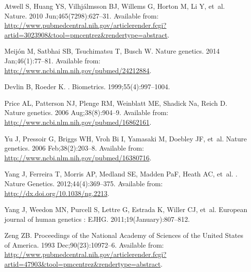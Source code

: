 \documentclass[10pt,letterpaper]{article}
\begin{document}
\begin{thebibliography}{10}
Atwell S, Huang YS, Vilhj\'{a}lmsson BJ, Willems G, Horton M, Li Y, et~al.
\newblock Nature. 2010 Jun;465(7298):627--31.
\newblock Available from:
  \url{http://www.pubmedcentral.nih.gov/articlerender.fcgi?artid=3023908\&tool=pmcentrez\&rendertype=abstract}.

Meij\'{o}n M, Satbhai SB, Tsuchimatsu T, Busch W.
\newblock Nature genetics. 2014 Jan;46(1):77--81.
\newblock Available from: \url{http://www.ncbi.nlm.nih.gov/pubmed/24212884}.

Devlin B, Roeder K.
.
\newblock Biometrics. 1999;55(4):997--1004.

Price AL, Patterson NJ, Plenge RM, Weinblatt ME, Shadick Na, Reich D.
\newblock Nature genetics. 2006 Aug;38(8):904--9.
\newblock Available from: \url{http://www.ncbi.nlm.nih.gov/pubmed/16862161}.

Yu J, Pressoir G, Briggs WH, {Vroh Bi} I, Yamasaki M, Doebley JF, et~al.
\newblock Nature genetics. 2006 Feb;38(2):203--8.
\newblock Available from: \url{http://www.ncbi.nlm.nih.gov/pubmed/16380716}.

Yang J, Ferreira T, Morris AP, Medland SE, Madden PaF, Heath AC, et~al.
.
\newblock Nature Genetics. 2012;44(4):369--375.
\newblock Available from: \url{http://dx.doi.org/10.1038/ng.2213}.

Yang J, Weedon MN, Purcell S, Lettre G, Estrada K, Willer CJ, et~al.
\newblock European journal of human genetics : EJHG. 2011;19(January):807--812.

Zeng ZB.
\newblock Proceedings of the National Academy of Sciences of the United States
  of America. 1993 Dec;90(23):10972--6.
\newblock Available from:
  \url{http://www.pubmedcentral.nih.gov/articlerender.fcgi?artid=47903\&tool=pmcentrez\&rendertype=abstract}.


\end{thebibliography}
\end{document}
